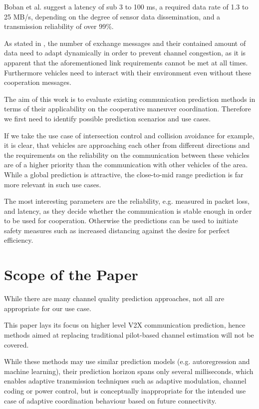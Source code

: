 \documentclass{IEEEtran}
\begin{document}
Boban et al. \cite{bobanConnectedRoadsFuture2018} suggest a latency of sub 3 to 100 ms, a required data rate of 1.3 to 25 MB/s, depending on the degree of sensor data dissemination, and a transmission reliability of over 99\%.

As stated in \cite{llatserCooperativeAutomatedDriving2019}, the number of exchange messages and their contained amount of data need to adapt dynamically in order to prevent channel congestion, as it is apparent that the aforementioned link requirements cannot be met at all times. Furthermore vehicles need to interact with their environment even without these cooperation messages.

The aim of this work is to evaluate existing communication prediction methods in terms of their applicability on the cooperative maneuver coordination. Therefore we first need to identify possible prediction scenarios and use cases.

If we take the use case of intersection control and collision avoidance for example, it is clear, that vehicles are approaching each other from different directions and the requirements on the reliability on the communication between these vehicles are of a higher priority than the communication with other vehicles of the area. While a global prediction is attractive, the close-to-mid range prediction is far more relevant in such use cases. 

The most interesting parameters are the reliability, e.g. measured in packet loss, and latency, as they decide whether the communication is stable enough in order to be used for cooperation. Otherwise the predictions can be used to initiate safety measures such as increased distancing against the desire for perfect efficiency.

\section{Scope of the Paper}
While there are many channel quality prediction approaches, not all are appropriate for our use case.

This paper lays its focus on higher level V2X communication prediction, hence methods aimed at replacing traditional pilot-based channel estimation will not be covered.

While these methods may use similar prediction models (e.g. autoregression and machine learning), their prediction horizon spans only several milliseconds, which enables adaptive transmission techniques such as adaptive modulation, channel coding or power control, but is conceptually inappropriate for the intended use case of adaptive coordination behaviour based on future connectivity.
\end{document}
